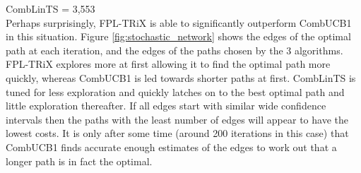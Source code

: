 CombLinTS = 3,553\\

Perhaps surprisingly, FPL-TRiX is able to significantly outperform CombUCB1 in this situation. Figure \ref{fig:stochastic_network} shows the edges of the optimal path at each iteration, and the edges of the paths chosen by the 3 algorithms. FPL-TRiX explores more at first allowing it to find the optimal path more quickly, whereas CombUCB1 is led towards shorter paths at first. CombLinTS is tuned for less exploration and quickly latches on to the best optimal path and little exploration thereafter. If all edges start with similar wide confidence intervals then the paths with the least number of edges will appear to have the lowest costs. It is only after some time (around 200 iterations in this case) that CombUCB1 finds accurate enough estimates of the edges to work out that a longer path is in fact the optimal.\\

